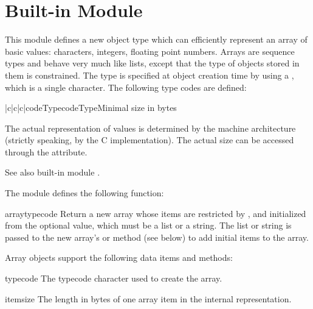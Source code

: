 \section{Built-in Module }

This module defines a new object type which can efficiently represent
an array of basic values: characters, integers, floating point
numbers.  Arrays are sequence types and behave very much like lists,
except that the type of objects stored in them is constrained.  The
type is specified at object creation time by using a ,
which is a single character.  The following type codes are defined:

\begin{tableiii}{|c|c|c|}{code}{Typecode}{Type}{Minimal size in bytes}
\end{tableiii}

The actual representation of values is determined by the machine
architecture (strictly speaking, by the C implementation).  The actual
size can be accessed through the  attribute.

See also built-in module .

The module defines the following function:

\renewcommand{\indexsubitem}{(in module array)}

\begin{funcdesc}{array}{typecode}
Return a new array whose items are restricted by , and
initialized from the optional  value, which must be a
list or a string.  The list or string is passed to the new array's
 or  method (see below) to add
initial items to the array.
\end{funcdesc}

Array objects support the following data items and methods:

\begin{datadesc}{typecode}
The typecode character used to create the array.
\end{datadesc}

\begin{datadesc}{itemsize}
The length in bytes of one array item in the internal representation.
\end{datadesc}

